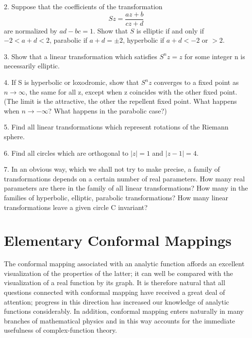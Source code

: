 2. Suppose that the coefficients of the transformation
\begin{equation*}
S z = \frac {a z + b}{c z + d}
\end{equation*}
are normalized by $ad - bc = 1$. Show that $S$ is elliptic if and only if $-2 < a + d < 2$, parabolic if $a + d = \pm 2$, hyperbolic if $a + d < -2$ or $>2$.

3. Show that a linear transformation which satisfies $S^{n}z = z$ for some integer n is necessarily elliptic.

4. If S is hyperbolic or loxodromic, show that $S^{n}z$ converges to a fixed point as $n \to \infty$, the same for all z, except when z coincides with the other fixed point. (The limit is the attractive, the other the repellent fixed point. What happens when $n \to -\infty$? What happens in the parabolic case?)

5. Find all linear transformations which represent rotations of the Riemann sphere.

6. Find all circles which are orthogonal to $|z| = 1$ and $|z - 1| = 4$.


7. In an obvious way, which we shall not try to make precise, a family of transformations depends on a certain number of real parameters. How many real parameters are there in the family of all linear transformations? How many in the families of hyperbolic, elliptic, parabolic transformations? How many linear transformations leave a given circle C invariant?

\setcounter{section}{3}\section{Elementary Conformal Mappings}\label{sec:3.4}
The conformal mapping associated with an analytic function affords an excellent visualization of the properties of the latter; it can well be compared with the visualization of a real function by its graph. It is therefore natural that all questions connected with conformal mapping have received a great deal of attention; progress in this direction has increased our knowledge of analytic functions considerably. In addition, conformal mapping enters naturally in many branches of mathematical physics and in this way accounts for the immediate usefulness of complex-function theory.


